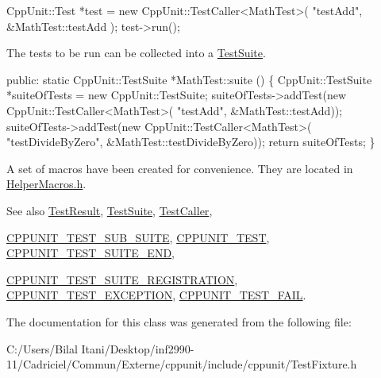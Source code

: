 \begin{DoxyCode}
CppUnit::Test *test = \textcolor{keyword}{new} CppUnit::TestCaller<MathTest>( \textcolor{stringliteral}{"testAdd"}, 
                                                         &MathTest::testAdd );
test->run();
\end{DoxyCode}


The tests to be run can be collected into a \hyperlink{class_test_suite}{Test\+Suite}.


\begin{DoxyCode}
\textcolor{keyword}{public}: 
  \textcolor{keyword}{static} CppUnit::TestSuite *MathTest::suite () \{
     CppUnit::TestSuite *suiteOfTests = \textcolor{keyword}{new} CppUnit::TestSuite;
     suiteOfTests->addTest(\textcolor{keyword}{new} CppUnit::TestCaller<MathTest>(
                             \textcolor{stringliteral}{"testAdd"}, &MathTest::testAdd));
     suiteOfTests->addTest(\textcolor{keyword}{new} CppUnit::TestCaller<MathTest>(
                             \textcolor{stringliteral}{"testDivideByZero"}, &MathTest::testDivideByZero));
     \textcolor{keywordflow}{return} suiteOfTests;
 \}
\end{DoxyCode}


A set of macros have been created for convenience. They are located in \hyperlink{_helper_macros_8h}{Helper\+Macros.\+h}.

\begin{DoxySeeAlso}{See also}
\hyperlink{class_test_result}{Test\+Result}, \hyperlink{class_test_suite}{Test\+Suite}, \hyperlink{class_test_caller}{Test\+Caller}, 

\hyperlink{group___writing_test_fixture_gae19f30ade82172cf6c3ff297367a10c2}{C\+P\+P\+U\+N\+I\+T\+\_\+\+T\+E\+S\+T\+\_\+\+S\+U\+B\+\_\+\+S\+U\+I\+TE}, \hyperlink{group___writing_test_fixture_ga6ba5fe7b8f52e401268b984008838754}{C\+P\+P\+U\+N\+I\+T\+\_\+\+T\+E\+ST}, \hyperlink{group___writing_test_fixture_ga3b353d6e84f681ae85cced96dce0a4ae}{C\+P\+P\+U\+N\+I\+T\+\_\+\+T\+E\+S\+T\+\_\+\+S\+U\+I\+T\+E\+\_\+\+E\+ND}, 

\hyperlink{_helper_macros_8h_a70f00cc9f589d24019ee9efee4de2d74}{C\+P\+P\+U\+N\+I\+T\+\_\+\+T\+E\+S\+T\+\_\+\+S\+U\+I\+T\+E\+\_\+\+R\+E\+G\+I\+S\+T\+R\+A\+T\+I\+ON}, \hyperlink{group___writing_test_fixture_ga0d51339f412270aee9a2d6c015d80ef2}{C\+P\+P\+U\+N\+I\+T\+\_\+\+T\+E\+S\+T\+\_\+\+E\+X\+C\+E\+P\+T\+I\+ON}, \hyperlink{group___writing_test_fixture_ga5bdaf0444216a8f93ead13d5ae964d7e}{C\+P\+P\+U\+N\+I\+T\+\_\+\+T\+E\+S\+T\+\_\+\+F\+A\+IL}. 
\end{DoxySeeAlso}


The documentation for this class was generated from the following file\+:\begin{DoxyCompactItemize}
\item 
C\+:/\+Users/\+Bilal Itani/\+Desktop/inf2990-\/11/\+Cadriciel/\+Commun/\+Externe/cppunit/include/cppunit/Test\+Fixture.\+h\end{DoxyCompactItemize}
